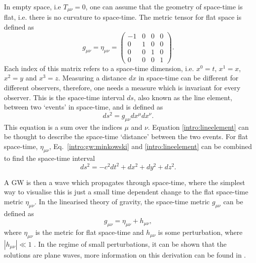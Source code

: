 In empty space, i.e $T_{\mu \nu} = 0$, one can assume that the geometry of space-time is flat, i.e. there is no curvature to space-time. The metric tensor for flat space is defined as
\begin{equation}
    \label{intro:gw:minkowski}
g_{\mu \nu} = \eta_{\mu \nu} = \left(
\begin{matrix}
-1 & 0 & 0 & 0 \\
0 & 1 & 0 & 0 \\
0 & 0 & 1 & 0 \\
0 & 0 & 0 & 1 
\end{matrix}
\right).
\end{equation}
Each index of this matrix refers to a space-time dimension, i.e. $x^0 = t$,
$x^1=x$, $x^2=y$ and $x^3=z$.  Measuring a distance $dx$ in space-time can be
different for different observers, therefore, one needs a measure which is
invariant for every observer.  This is the space-time interval $ds$, also known
as the line element, between two `events' in space-time, and is defined as
\begin{equation}
\label{intro:lineelement}
    ds^2 = g_{\mu \nu} dx^{\mu}dx^{\nu}.
\end{equation}
This equation is a sum over the indices $\mu$ and
$\nu$.  
Equation \ref{intro:lineelement} can be
thought to describe the space-time `distance' between the two events.  For flat
space-time, $\eta_{\mu\nu}$, Eq.~\ref{intro:gw:minkowski} and \ref{intro:lineelement} can be combined to find the space-time interval
%
\begin{equation}
    ds^2 = -c^2 dt^2 + dx^2 + dy^2 + dz^2.
\end{equation}
%

A \gls{GW} is then a wave which propagates through space-time, where the simplest way to
visualise this is just a small time dependent change to the flat space-time
metric $\eta_{\mu\nu}$.  In the linearised theory of gravity, the
space-time metric $g_{\mu \nu}$ can be defined as
\begin{equation}
\label{intro:gravwave:metric}
    g_{\mu \nu} = \eta_{\mu \nu} + h_{\mu \nu},
\end{equation}
where $ \eta_{\mu \nu}$ is the metric for flat space-time and $h_{\mu \nu}$ is
some perturbation, where $|h_{\mu \nu}| \ll 1$
\citep{flanagan2005BasicsGravitational}. In the regime of small perturbations, it can be shown that the solutions are plane waves,
more information on this derivation can be found in
\citep{flanagan2005BasicsGravitational,letiec2016TheoryGravitational}.  


